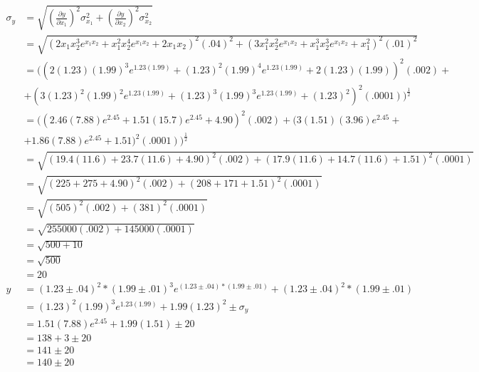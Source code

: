 \documentclass{article}
\begin{document}
\begin{enumerate}
\begin{enumerate}
\begin{align*}
\sigma_{y} &= \sqrt{(\frac{\partial y}{\partial x_1})^2\sigma_{x_1}^2 + (\frac{\partial y}{\partial x_2})^2\sigma_{x_2}^2}\\
&= \sqrt{(2x_1x_2^3e^{x_1x_2} + x_1^2x_2^4e^{x_1x_2} + 2x_1x_2)^2(.04)^2 + (3x_1^2x_2^2e^{x_1x_2} + x_1^3x_2^3e^{x_1x_2} + x_1^2)^2(.01)^2}\\
&= ((2(1.23)(1.99)^3e^{1.23(1.99)} + (1.23)^2(1.99)^4e^{1.23(1.99)} + 2(1.23)(1.99))^2(.002) +\\
&+ (3(1.23)^2(1.99)^2e^{1.23(1.99)} + (1.23)^3(1.99)^3e^{1.23(1.99)} + (1.23)^2)^2(.0001))^{\frac{1}{2}}\\
&= ((2.46(7.88)e^{2.45} + 1.51(15.7)e^{2.45} + 4.90)^2(.002) + (3(1.51)(3.96)e^{2.45} +\\
&+ 1.86(7.88)e^{2.45} + 1.51)^2(.0001))^{\frac{1}{2}}\\
&= \sqrt{(19.4(11.6) + 23.7(11.6) + 4.90)^2(.002) + (17.9(11.6) + 14.7(11.6) + 1.51)^2(.0001)}\\
&= \sqrt{(225 + 275 + 4.90)^2(.002) + (208 + 171 + 1.51)^2(.0001)}\\
&= \sqrt{(505)^2(.002) + (381)^2(.0001)}\\
&= \sqrt{255000(.002) + 145000(.0001)}\\
&= \sqrt{500 + 10}\\
&= \sqrt{500}\\
&= 20\\
y &= (1.23 \pm .04)^2 * (1.99 \pm .01)^3e^{(1.23 \pm .04) * (1.99 \pm .01)} + (1.23 \pm .04)^2 * (1.99 \pm .01)\\
&= (1.23)^2(1.99)^3e^{1.23(1.99)} + 1.99(1.23)^2 \pm \sigma_{y}\\
&= 1.51(7.88)e^{2.45} + 1.99(1.51) \pm 20\\
&= 138 + 3 \pm 20\\
&= 141 \pm 20\\
&= 140 \pm 20
\end{align*}
\end{enumerate}
\end{enumerate}
\end{document}
